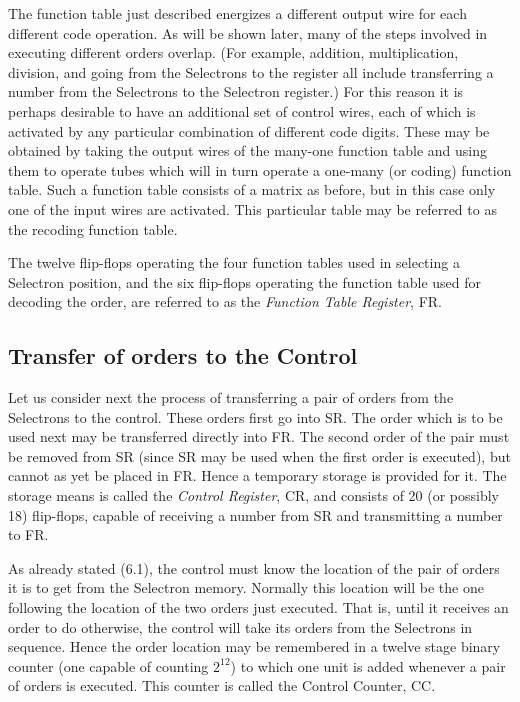 \documentclass[12pt]{amsart}
\begin{document}
The function table just described energizes a different output wire for each different code operation. As will be shown later, many of the steps involved in executing different orders overlap. (For example, addition, multiplication, division, and going from the Selectrons to the register all include transferring a number from the Selectrons to the Selectron register.) For this reason it is perhaps desirable to have an additional set of control wires, each of which is activated by any particular combination of different code digits. These may be obtained by taking the output wires of the many-one function table and using them to operate tubes which will in turn operate a one-many (or coding) function table. Such a function table consists of a matrix as before, but in this case only one of the input wires are activated. This particular table may be referred to as the recoding function table.

The twelve flip-flops operating the four function tables used in selecting a Selectron position, and the six flip-flops operating the function table used for decoding the order, are referred to as the \emph{Function Table Register}, FR.

\subsection{Transfer of orders to the Control}
Let us consider next the process of transferring a pair of orders from the Selectrons to the control. These orders first go into SR. The order which is to be used next may be transferred directly into FR. The second order of the pair must be removed from SR (since SR may be used when the first order is executed), but cannot as yet be placed in FR. Hence a temporary storage is provided for it. The storage means is called the \emph{Control Register}, CR, and consists of 20 (or possibly 18) flip-flops, capable of receiving a number from SR and transmitting a number to FR.

As already stated (6.1), the control must know the location of the pair of orders it is to get from the Selectron memory. Normally this location will be the one following the location of the two orders just executed. That is, until it receives an order to do otherwise, the control will take its orders from the Selectrons in sequence. Hence the order location may be remembered in a twelve stage binary counter (one capable of counting $2^12$) to which one unit is added whenever a pair of orders is executed. This counter is called the Control Counter, CC.
\end{document}

